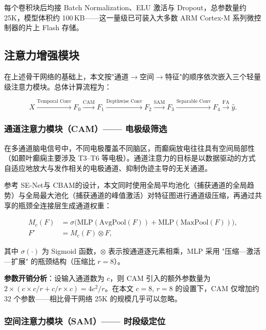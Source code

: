 \documentclass[12pt, a4paper]{article}
\begin{document}
每个卷积块后均接 Batch Normalization\cite{ref_ioffe2015}、ELU 激活与 Dropout\cite{ref_srivastava2014}，总参数量约 25K，模型体积约 100\,KB——这一量级已可装入大多数 ARM Cortex-M 系列微控制器的片上 Flash 存储。

\subsection{注意力增强模块}

在上述骨干网络的基础上，本文按"通道$\rightarrow$空间$\rightarrow$特征"的顺序依次嵌入三个轻量级注意力模块。总体计算流程为：

\begin{equation}
X \xrightarrow{\text{Temporal Conv}} F_0 \xrightarrow{\text{CAM}} F_1 \xrightarrow{\text{Depthwise Conv}} F_2 \xrightarrow{\text{SAM}} F_3 \xrightarrow{\text{Separable Conv}} F_4 \xrightarrow{\text{FA}} \hat{y}.
\end{equation}

\subsubsection{通道注意力模块（CAM）—— 电极级筛选}

在多通道脑电信号中，不同电极覆盖不同脑区，而癫痫放电往往具有空间局部性（如颞叶癫痫主要涉及 T3--T6 等电极）。通道注意力的目标是以数据驱动的方式自适应地放大与发作相关的电极通道、抑制伪迹主导的无关通道。

参考 SE-Net\cite{ref_hu2018}与 CBAM\cite{ref_woo2018}的设计，本文同时使用全局平均池化（捕获通道的全局趋势）与全局最大池化（捕获通道的峰值激活）对特征图进行通道级压缩，再通过共享的瓶颈全连接层生成通道权重：

\begin{align}
M_c(F) &= \sigma\big(\mathrm{MLP}(\mathrm{AvgPool}(F)) + \mathrm{MLP}(\mathrm{MaxPool}(F))\big), \\
F' &= M_c(F) \otimes F,
\end{align}

其中 $\sigma(\cdot)$ 为 Sigmoid 函数，$\otimes$ 表示按通道逐元素相乘，MLP 采用 "压缩—激活—扩展" 的瓶颈结构（压缩比 $r=8$）。

\textbf{参数开销分析}：设输入通道数为 $c$，则 CAM 引入的额外参数量为 $2 \times (c \times c/r + c/r \times c) = 4c^2/r$。在本文 $c=8$, $r=8$ 的设置下，CAM 仅增加约 32 个参数——相比骨干网络 25K 的规模几乎可以忽略。

\subsubsection{空间注意力模块（SAM）—— 时段级定位}
\end{document}
